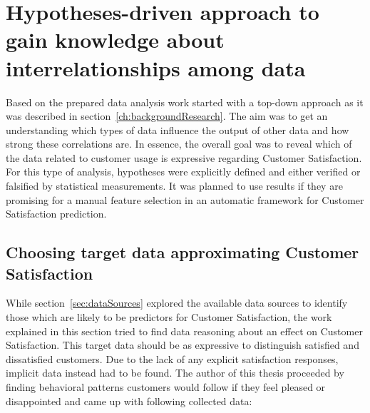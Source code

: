\section{Hypotheses-driven approach to gain knowledge about interrelationships among data}

Based on the prepared data analysis work started with a top-down approach as it was described in section~\ref{ch:backgroundResearch}. The aim was to get an understanding which types of data influence the output of other data and how strong these correlations are. In essence, the overall goal was to reveal which of the data related to customer usage is expressive regarding Customer Satisfaction. For this type of analysis, hypotheses were explicitly defined and either verified or falsified by statistical measurements. It was planned to use results if they are promising for a manual feature selection in an automatic framework for Customer Satisfaction prediction. 

\subsection{Choosing target data approximating Customer Satisfaction}

While section~\ref{sec:dataSources} explored the available data sources to identify those which are likely to be predictors for Customer Satisfaction, the work explained in this section tried to find data reasoning about an effect on Customer Satisfaction. This target data should be as expressive to distinguish satisfied and dissatisfied customers. Due to the lack of any explicit satisfaction responses, implicit data instead had to be found. The author of this thesis proceeded by finding behavioral patterns customers would follow if they feel pleased or disappointed and came up with following collected data:

